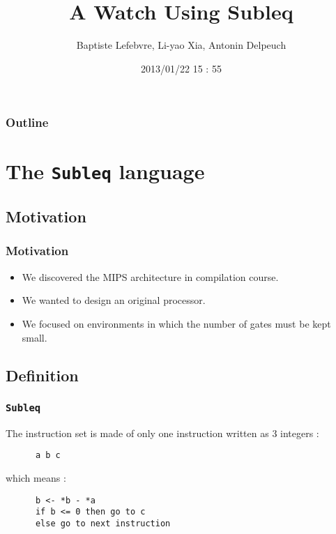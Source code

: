 \documentclass{beamer}
\begin{document}
\makeatletter

\title{A Watch Using Subleq}
\author{Baptiste Lefebvre, Li-yao Xia, Antonin Delpeuch}
\date{2013/01/22 15 : 55}

\begin{frame}
    \maketitle
\end{frame}

\begin{frame}
    \frametitle{Outline}
    \tableofcontents
\end{frame}

\section{The \texttt{Subleq} language}
\subsection{Motivation}

\begin{frame}
    \frametitle{Motivation}

    \begin{itemize}
        \item We discovered the MIPS architecture in compilation course.
        \item We wanted to design an original processor.
        \item We focused on environments in which the number of gates must be kept small.
    \end{itemize}

\end{frame}

\subsection{Definition}
\begin{frame}[fragile]
    \frametitle{\texttt{Subleq}}

    The instruction set is made of only one instruction written as 3
    integers :
    \\[11pt]
    \begin{verbatim}
      a b c
    \end{verbatim}
    which means :

    \begin{verbatim}
      b <- *b - *a
      if b <= 0 then go to c
      else go to next instruction
    \end{verbatim}

\end{frame}
\end{document}
